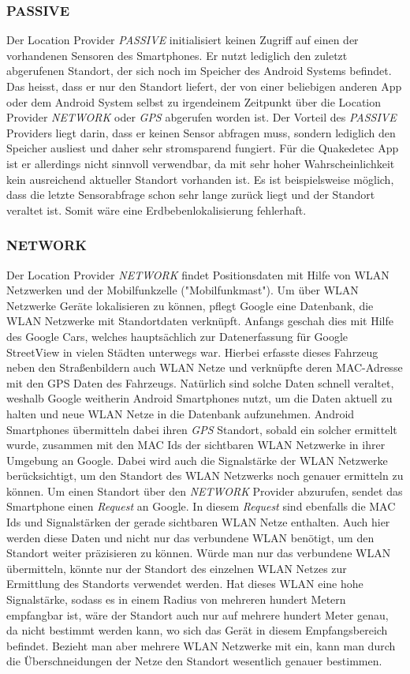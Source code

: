\subsubsection{PASSIVE}
Der Location Provider \textit{PASSIVE} initialisiert keinen Zugriff auf einen der vorhandenen Sensoren des Smartphones. Er nutzt lediglich den zuletzt abgerufenen Standort, der sich noch im Speicher des Android Systems befindet. Das heisst, dass er nur den Standort liefert, der von einer beliebigen anderen App oder dem Android System selbst zu irgendeinem Zeitpunkt über die Location Provider \textit{NETWORK} oder \textit{GPS} abgerufen worden ist. Der Vorteil des \textit{PASSIVE} Providers liegt darin, dass er keinen Sensor abfragen muss, sondern lediglich den Speicher ausliest und daher sehr stromsparend fungiert. Für die Quakedetec App ist er allerdings nicht sinnvoll verwendbar, da mit sehr hoher Wahrscheinlichkeit kein ausreichend aktueller Standort vorhanden ist. Es ist beispielsweise möglich, dass die letzte Sensorabfrage schon sehr lange zurück liegt und der Standort veraltet ist.
Somit wäre eine Erdbebenlokalisierung fehlerhaft.

\subsubsection{NETWORK}
Der Location Provider \textit{NETWORK} findet Positionsdaten mit Hilfe von WLAN Netzwerken und der Mobilfunkzelle ("Mobilfunkmast"). 
Um über WLAN Netzwerke Geräte lokalisieren zu können, pflegt Google eine Datenbank, die WLAN Netzwerke mit Standortdaten verknüpft.
Anfangs geschah dies mit Hilfe des Google Cars, welches hauptsächlich zur Datenerfassung für Google StreetView in vielen Städten unterwegs war. Hierbei erfasste dieses Fahrzeug neben den Straßenbildern auch WLAN Netze und verknüpfte deren MAC-Adresse mit den GPS Daten des Fahrzeugs.
Natürlich sind solche Daten schnell veraltet, weshalb Google weitherin Android Smartphones nutzt, um die Daten aktuell zu halten und neue WLAN Netze in die Datenbank aufzunehmen.
Android Smartphones übermitteln dabei ihren \textit{GPS} Standort, sobald ein solcher ermittelt wurde, zusammen mit den MAC Ids der sichtbaren WLAN Netzwerke in ihrer Umgebung an Google. Dabei wird auch die Signalstärke der WLAN Netzwerke berücksichtigt, um den Standort des WLAN Netzwerks noch genauer ermitteln zu können.
Um einen Standort über den \textit{NETWORK} Provider abzurufen, sendet das Smartphone einen \textit{Request} an Google. In diesem \textit{Request} sind ebenfalls die MAC Ids und Signalstärken der gerade sichtbaren WLAN Netze enthalten. Auch hier werden diese Daten und nicht nur das verbundene WLAN benötigt, um den Standort weiter präzisieren zu können. Würde man nur das verbundene WLAN übermitteln, könnte nur der Standort des einzelnen WLAN Netzes zur Ermittlung des Standorts verwendet werden. Hat dieses WLAN eine hohe Signalstärke, sodass es in einem Radius von mehreren hundert Metern empfangbar ist, wäre der Standort auch nur auf mehrere hundert Meter genau, da nicht bestimmt werden kann, wo sich das Gerät in diesem Empfangsbereich befindet. Bezieht man aber mehrere WLAN Netzwerke mit ein, kann man durch die Überschneidungen der Netze den Standort wesentlich genauer bestimmen. 

